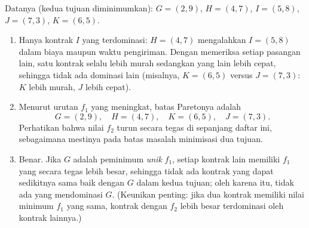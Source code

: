 
Datanya (kedua tujuan diminimumkan):
$G = (2,9)$, $H = (4,7)$, $I = (5,8)$, $J = (7,3)$, $K = (6,5)$.

\begin{enumerate}
\item Hanya kontrak $I$ yang terdominasi: $H = (4,7)$ mengalahkan
$I = (5,8)$ dalam biaya maupun waktu pengiriman. Dengan memeriksa setiap
pasangan lain, satu kontrak selalu lebih murah sedangkan yang lain lebih cepat,
sehingga tidak ada dominasi lain (misalnya, $K = (6,5)$ versus $J = (7,3)$:
$K$ lebih murah, $J$ lebih cepat).
\item Menurut urutan $f_1$ yang meningkat, batas Paretonya adalah
\[
G = (2,9), \quad H = (4,7), \quad K = (6,5), \quad J = (7,3).
\]
Perhatikan bahwa nilai $f_2$ turun secara tegas di sepanjang daftar ini,
sebagaimana mestinya pada batas masalah minimisasi dua tujuan.
\item Benar. Jika $G$ adalah peminimum \emph{unik} $f_1$, setiap kontrak lain
memiliki $f_1$ yang secara tegas lebih besar, sehingga tidak ada kontrak yang
dapat sedikitnya sama baik dengan $G$ dalam kedua tujuan; oleh karena itu,
tidak ada yang mendominasi $G$. (Keunikan penting: jika dua kontrak memiliki
nilai minimum $f_1$ yang sama, kontrak dengan $f_2$ lebih besar terdominasi
oleh kontrak lainnya.)
\end{enumerate}


